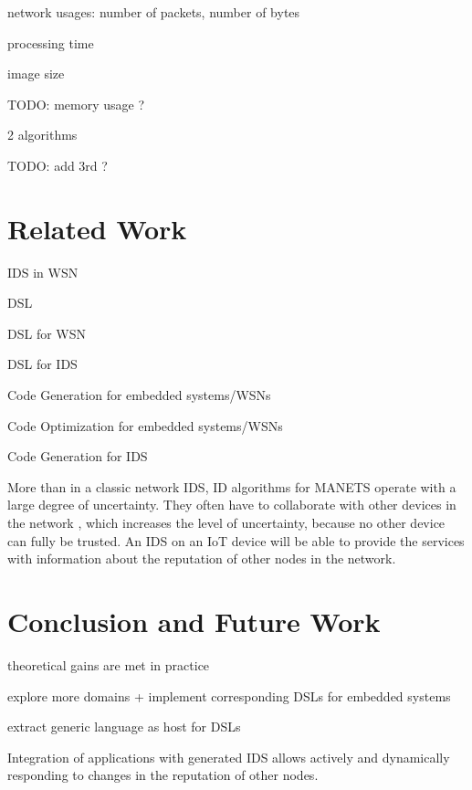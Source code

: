 \documentclass[conference]{IEEEtran}
\begin{document}
network usages: number of packets, number of bytes

processing time

image size

TODO: memory usage ?

2 algorithms \cite{ganeriwal2008reputation}

TODO: add 3rd ? \cite{krontiris2009cooperative}

\section{Related Work}
\label{related}

IDS in WSN \cite{perrig2004security,mishra2004intrusion}

DSL \cite{fowler2010domain,mernik2005and}

DSL for WSN \cite{naumowicz2009prototyping,levis2004tinyscript}

DSL for IDS \cite{eckmann2002statl}

Code Generation for embedded systems/WSNs \cite{leupers2000code,marwedel2002code}

Code Optimization for embedded systems/WSNs \cite{panda2001data,naik2001software}

Code Generation for IDS \cite{charitakis2003code}


More than in a classic network IDS, ID algorithms for MANETS operate with a
large degree of uncertainty. They often have to collaborate with other devices
in the network \cite{marchang2008collaborative,krontiris2009cooperative}, which
increases the level of uncertainty, because no other device can fully be
trusted. An IDS on an IoT device will be able to provide the services with
information about the reputation \cite{ganeriwal2008reputation} of other nodes
in the network.

\section{Conclusion and Future Work}
\label{conclusion}

theoretical gains are met in practice

explore more domains + implement corresponding DSLs for embedded systems

extract generic language as host for DSLs

Integration of applications with generated IDS allows actively and dynamically
responding to changes in the reputation of other nodes.
\end{document}
